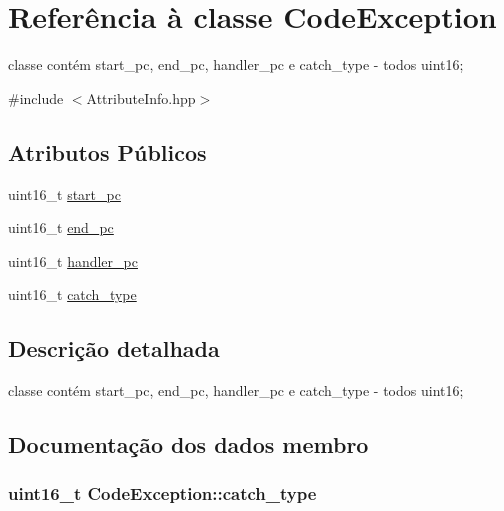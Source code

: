 \hypertarget{class_code_exception}{}\section{Referência à classe Code\+Exception}
\label{class_code_exception}


classe contém start\+\_\+pc, end\+\_\+pc, handler\+\_\+pc e catch\+\_\+type -\/ todos uint16;  




{\ttfamily \#include $<$Attribute\+Info.\+hpp$>$}

\subsection*{Atributos Públicos}
\begin{DoxyCompactItemize}
\item 
uint16\+\_\+t \hyperlink{class_code_exception_a18754b054d8331acbad758612698e599}{start\+\_\+pc}
\item 
uint16\+\_\+t \hyperlink{class_code_exception_a357306bca81fcf2e7bc9dfcedc9c4f96}{end\+\_\+pc}
\item 
uint16\+\_\+t \hyperlink{class_code_exception_a8c66a2462bd2668d7824e7f3745385d6}{handler\+\_\+pc}
\item 
uint16\+\_\+t \hyperlink{class_code_exception_a0b2110e6c93d442c66cf10563920537c}{catch\+\_\+type}
\end{DoxyCompactItemize}


\subsection{Descrição detalhada}
classe contém start\+\_\+pc, end\+\_\+pc, handler\+\_\+pc e catch\+\_\+type -\/ todos uint16; 

\subsection{Documentação dos dados membro}
\subsubsection[{\texorpdfstring{catch\+\_\+type}{catch_type}}]{\setlength{\rightskip}{0pt plus 5cm}uint16\+\_\+t Code\+Exception\+::catch\+\_\+type}\hypertarget{class_code_exception_a0b2110e6c93d442c66cf10563920537c}{}\label{class_code_exception_a0b2110e6c93d442c66cf10563920537c}
